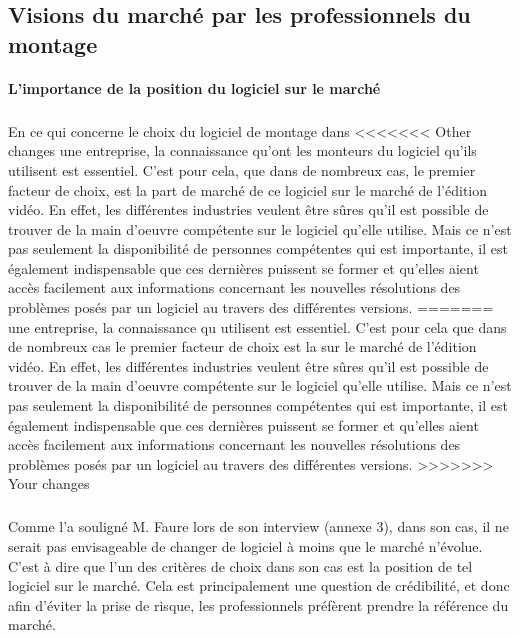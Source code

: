\begin{itemize}
\newpage

\section{Visions du marché par les professionnels du montage}

\paragraph{L'importance de la position du logiciel sur le marché}

\subparagraph{} En ce qui concerne le choix du logiciel de montage dans
<<<<<<< Other changes
une entreprise, la connaissance qu'ont les monteurs du logiciel qu'ils
utilisent est essentiel.  C'est pour cela, que dans de nombreux cas,
le premier facteur de choix, est la part de marché de ce logiciel sur
le marché de l'édition vidéo. En effet, les différentes industries
veulent être sûres qu'il est possible de trouver de la main d'oeuvre
compétente sur le logiciel qu'elle utilise.  Mais ce n'est pas seulement
la disponibilité de personnes compétentes qui est importante, il
est également indispensable que ces dernières puissent se former
et qu'elles aient accès facilement aux informations concernant les
nouvelles résolutions des problèmes posés par un logiciel au travers
des différentes versions.
=======
une entreprise, la connaissance qu%
utilisent est essentiel.  C'est pour cela que dans de nombreux cas
le premier facteur de choix est la %
sur le marché de l'édition vidéo. En effet, les différentes
industries veulent être sûres qu'il est possible de trouver de la
main d'oeuvre compétente sur le logiciel qu'elle utilise.  Mais ce
n'est pas seulement la disponibilité de personnes compétentes qui
est importante, il est également indispensable que ces dernières
puissent se former et qu'elles aient accès facilement aux informations
concernant les nouvelles résolutions des problèmes posés par un
logiciel au travers des différentes versions.
>>>>>>> Your changes

\subparagraph{} Comme l'a souligné M. Faure lors de son interview
(annexe 3), dans son cas, il ne serait pas envisageable de changer de
logiciel à moins que le marché n'évolue. C'est à dire que l'un des
critères de choix dans son cas est la position de tel logiciel sur
le marché. Cela est principalement une question de crédibilité, et
donc afin d'éviter la prise de risque, les professionnels préfèrent
prendre la référence du marché.


\end{itemize}
